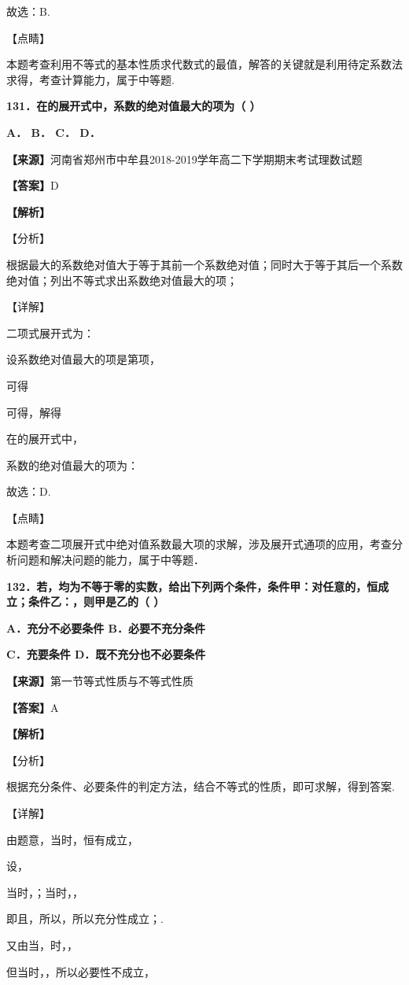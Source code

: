 \documentclass[
]{article}
\begin{document}
故选：B.

【点睛】

本题考查利用不等式的基本性质求代数式的最值，解答的关键就是利用待定系数法求得，考查计算能力，属于中等题.

\textbf{131．在的展开式中，系数的绝对值最大的项为（ ）}

\textbf{A． B． C． D．}

\textbf{【来源】}河南省郑州市中牟县2018-2019学年高二下学期期末考试理数试题

\textbf{【答案】}D

\textbf{【解析】}

【分析】

根据最大的系数绝对值大于等于其前一个系数绝对值；同时大于等于其后一个系数绝对值；列出不等式求出系数绝对值最大的项；

【详解】

二项式展开式为：

设系数绝对值最大的项是第项，

可得

可得，解得

在的展开式中，

系数的绝对值最大的项为：

故选：D.

【点睛】

本题考查二项展开式中绝对值系数最大项的求解，涉及展开式通项的应用，考查分析问题和解决问题的能力，属于中等题．

\textbf{132．若，均为不等于零的实数，给出下列两个条件，条件甲：对任意的，恒成立；条件乙：，则甲是乙的（
）}

\textbf{A．充分不必要条件 B．必要不充分条件}

\textbf{C．充要条件 D．既不充分也不必要条件}

\textbf{【来源】}第一节等式性质与不等式性质

\textbf{【答案】}A

\textbf{【解析】}

【分析】

根据充分条件、必要条件的判定方法，结合不等式的性质，即可求解，得到答案.

【详解】

由题意，当时，恒有成立，

设，

当时，；当时，，

即且，所以，所以充分性成立；.

又由当，时，，

但当时，，所以必要性不成立，
\end{document}
